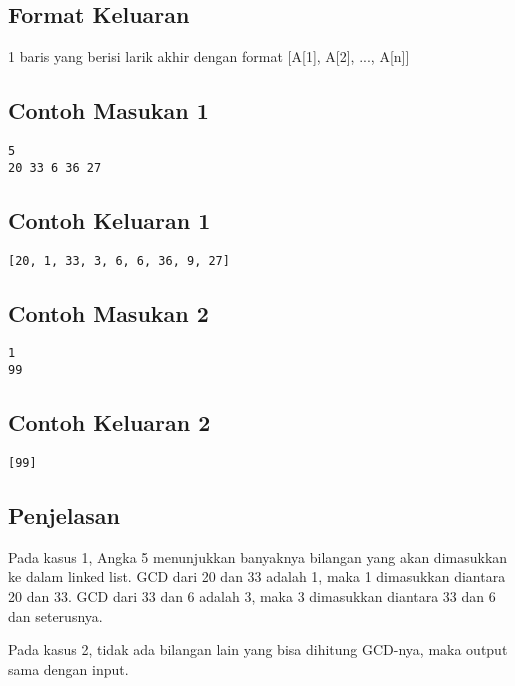 \documentclass{article}
\begin{document}
\subsection*{Format Keluaran}

1 baris yang berisi larik akhir dengan format
[A[1], A[2], ..., A[n]]

\begin{multicols}{2}
\subsection*{Contoh Masukan 1}
\begin{lstlisting}
5
20 33 6 36 27
\end{lstlisting}
\columnbreak
\subsection*{Contoh Keluaran 1}
\begin{lstlisting}
[20, 1, 33, 3, 6, 6, 36, 9, 27]
\end{lstlisting}
\vfill
\null
\end{multicols}

\begin{multicols}{2}
\subsection*{Contoh Masukan 2}
\begin{lstlisting}
1
99
\end{lstlisting}
\columnbreak
\subsection*{Contoh Keluaran 2}
\begin{lstlisting}
[99]
\end{lstlisting}
\vfill
\null
\end{multicols}

\subsection*{Penjelasan}

Pada kasus 1, Angka 5 menunjukkan banyaknya bilangan yang akan dimasukkan ke dalam linked list. GCD dari 20 dan 33 adalah 1, maka 1 dimasukkan diantara 20 dan 33. GCD dari 33 dan 6 adalah 3, maka 3 dimasukkan diantara 33 dan 6 dan seterusnya.

Pada kasus 2, tidak ada bilangan lain yang bisa dihitung GCD-nya, maka output sama dengan input.
\end{document}
